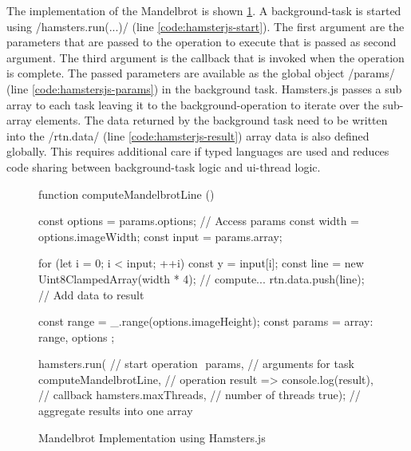 The implementation of the Mandelbrot is shown \cref{fig:mandelbrot-hamsterjs}. A background-task is started using \javascriptinline/hamsters.run(...)/ (line \ref{code:hamsterjs-start}). The first argument are the parameters that are passed to the operation to execute that is passed as second argument. The third argument is the callback that is invoked when the operation is complete. The passed parameters are available as the global object \javascriptinline/params/ (line \ref{code:hamstersjs-params}) in the background task. Hamsters.js passes a sub array to each task leaving it to the background-operation to iterate over the sub-array elements. The data returned by the background task need to be written into the \javascriptinline/rtn.data/ (line \ref{code:hamsterjs-result}) array data is also defined globally. This requires additional care if typed languages are used and reduces code sharing between background-task logic and ui-thread logic.

\begin{figure}
\begin{javascriptcode}
function computeMandelbrotLine () {
	const options = params.options; // Access params$\label{code:hamstersjs-params}$
	const width = options.imageWidth;
	const input = params.array;

	for (let i = 0; i < input; ++i) {
		const y = input[i];
		const line = new Uint8ClampedArray(width * 4);
		// compute...
		rtn.data.push(line); // Add data to result $\label{code:hamsterjs-result}$
	}
}

const range = _.range(options.imageHeight);
const params = {
	array: range,
	options
};

hamsters.run( // start operation $\label{code:hamsterjs-start}$
	params,  // arguments for task
	computeMandelbrotLine, // operation
	result => console.log(result), // callback
	hamsters.maxThreads, // number of threads
	true); // aggregate results into one array
\end{javascriptcode}
\caption{Mandelbrot Implementation using Hamsters.js}
\label{fig:mandelbrot-hamsterjs}
\end{figure}

